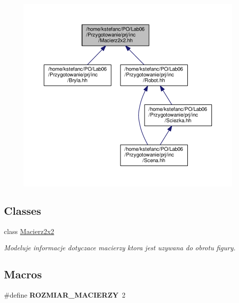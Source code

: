 \begin{figure}[H]
\begin{center}
\leavevmode
\includegraphics[width=350pt]{_macierz2x2_8hh__dep__incl}
\end{center}
\end{figure}
\subsection*{Classes}
\begin{DoxyCompactItemize}
\item 
class \hyperlink{class_macierz2x2}{Macierz2x2}
\begin{DoxyCompactList}\small\item\em Modeluje informacje dotyczace macierzy ktora jest uzywana do obrotu figury. \end{DoxyCompactList}\end{DoxyCompactItemize}
\subsection*{Macros}
\begin{DoxyCompactItemize}
\item 
\hypertarget{_macierz2x2_8hh_a9d01784f7ff1b3fd53cb75db78488adc}{\#define {\bfseries R\+O\+Z\+M\+I\+A\+R\+\_\+\+M\+A\+C\+I\+E\+R\+Z\+Y}~2}\label{_macierz2x2_8hh_a9d01784f7ff1b3fd53cb75db78488adc}

\end{DoxyCompactItemize}
